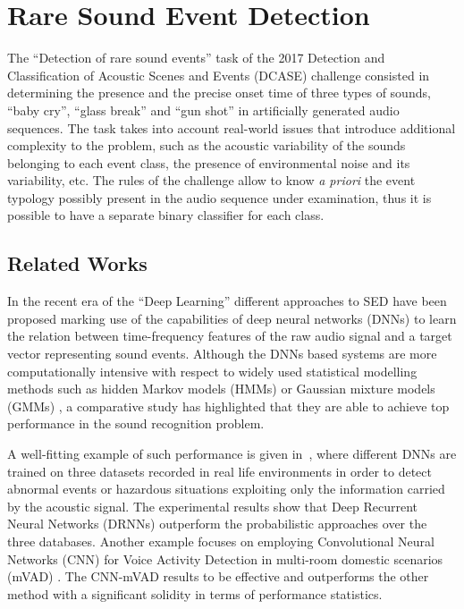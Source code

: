 \section{Rare Sound Event Detection}
\label{sec:rare_sed}
The ``Detection of rare sound events'' task of the 2017 Detection and Classification of Acoustic Scenes and Events (DCASE) challenge \cite{DCASE2017Workshop} consisted in determining the presence and the precise onset time of three types of sounds, ``baby cry'', ``glass break'' and ``gun shot'' in artificially generated audio sequences. 
The task takes into account real-world issues that introduce additional complexity to the problem, such as the acoustic variability of the sounds belonging to each event class, the presence of environmental noise and its variability, etc. The rules of the challenge allow to know \textit{a priori} the event typology possibly present in the audio sequence under examination, thus it is possible to have a separate binary classifier for each class.

\subsection{Related Works}
In the recent era of the ``Deep Learning'' different approaches to SED have been proposed marking use of the capabilities of deep neural networks (DNNs) to learn the relation between time-frequency features of the raw audio signal and a target vector representing sound events.
Although the DNNs based systems are more computationally intensive with respect to  widely used statistical modelling methods such as hidden Markov models (HMMs) or Gaussian mixture models (GMMs)  \cite{heittola2010audio, peng2009healthcare}, a comparative study \cite{sigtia2016automatic} has highlighted that they are able to achieve top performance in the sound recognition problem.

A well-fitting example of such performance is given in~\cite{marchi2017deep}, where different DNNs are trained on three datasets recorded in real life environments in order to detect abnormal events or hazardous situations exploiting only the information carried by the acoustic signal. The experimental results show that Deep Recurrent Neural Networks (DRNNs) outperform the probabilistic approaches over the three databases. 
Another example focuses on employing Convolutional Neural Networks (CNN)  for Voice Activity Detection in multi-room domestic scenarios (mVAD) \cite{vecchiotti2018convolutional}. The CNN-mVAD results to be effective and outperforms the other method with a significant solidity in terms of performance statistics.

